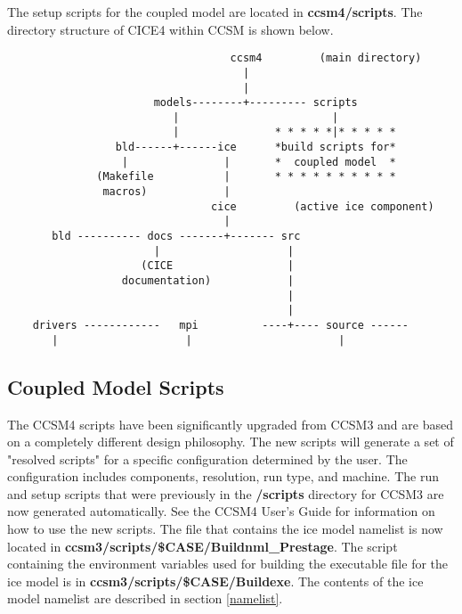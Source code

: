 
The setup scripts for the coupled model are 
located in {\bf ccsm4/scripts}. The directory structure of CICE4
within CCSM is shown below.

\begin{verbatim}
                                   ccsm4         (main directory)
                                     |
                                     |
                       models--------+--------- scripts
                          |                        |
                          |               * * * * *|* * * * * 
                 bld------+------ice      *build scripts for*
                  |               |       *  coupled model  *
              (Makefile           |       * * * * * * * * * *
               macros)            |
                                cice         (active ice component)
                                  |
       bld ---------- docs -------+------- src
                       |                    |
                     (CICE                  |
                  documentation)            |
                                            |
                                            |                  
    drivers ------------   mpi          ----+---- source ------
       |                    |                       |          
\end{verbatim}

\subsection{Coupled Model Scripts}
\label{uncoupled_scripts}

The CCSM4 scripts have been significantly upgraded from CCSM3 and are
based on a completely different design philosophy.  The new scripts will
generate a set of "resolved scripts" for a specific configuration determined
by the user. The configuration includes components, resolution, run type, and
machine. The run and setup scripts that were previously in the {\bf /scripts}
directory for CCSM3 are now generated automatically.  See the CCSM4 User's Guide for
information on how to use the new scripts.  The file that contains the ice model
namelist is now located in {\bf ccsm3/scripts/\$CASE/Buildnml\_Prestage}. The
script containing the environment variables used for building the executable
file for the ice model is in {\bf ccsm3/scripts/\$CASE/Buildexe}.
The contents of the ice model namelist are described in section \ref{namelist}.
